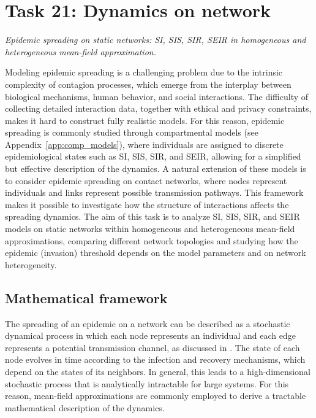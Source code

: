 \chapter{Task 21: Dynamics on network}

\noindent\textcolor{unipd}{\textit{Epidemic spreading on static networks: SI, SIS, SIR, SEIR in homogeneous and heterogeneous mean-field approximation.}}

Modeling epidemic spreading is a challenging problem due to the intrinsic complexity of contagion processes, which emerge from the interplay between biological mechanisms, human behavior, and social interactions. The difficulty of collecting detailed interaction data, together with ethical and privacy constraints, makes it hard to construct fully realistic models. For this reason, epidemic spreading is commonly studied through compartmental models (see Appendix~\ref{app:comp_models}), where individuals are assigned to discrete epidemiological states such as SI, SIS, SIR, and SEIR, allowing for a simplified but effective description of the dynamics. A natural extension of these models is to consider epidemic spreading on contact networks, where nodes represent individuals and links represent possible transmission pathways. This framework makes it possible to investigate how the structure of interactions affects the spreading dynamics. The aim of this task is to analyze SI, SIS, SIR, and SEIR models on static networks within homogeneous and heterogeneous mean-field approximations, comparing different network topologies and studying how the epidemic (invasion) threshold depends on the model parameters and on network heterogeneity.

\section{Mathematical framework}\label{sec:math}

The spreading of an epidemic on a network can be described as a stochastic dynamical process in which each node represents an individual and each edge represents a potential transmission channel, as discussed in \cite{epidemics}. The state of each node evolves in time according to the infection and recovery mechanisms, which depend on the states of its neighbors. In general, this leads to a high-dimensional stochastic process that is analytically intractable for large systems. For this reason, mean-field approximations are commonly employed to derive a tractable mathematical description of the dynamics.

